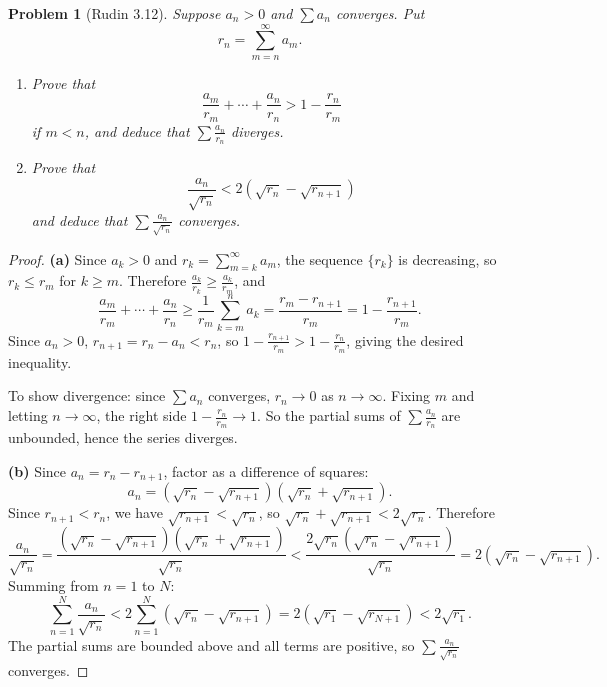 \documentclass[12 pt]{article}        	%
\newtheorem{prob}{Problem}
\begin{document}
\begin{prob}[Rudin 3.12]
Suppose $a_n > 0$ and $\sum a_n$ converges. Put
\[
r_n = \sum_{m=n}^{\infty} a_m.
\]
\begin{enumerate}
    \item[(a)] Prove that
    \[
    \frac{a_m}{r_m} + \cdots + \frac{a_n}{r_n} > 1 - \frac{r_n}{r_m}
    \]
    if $m < n$, and deduce that $\displaystyle\sum \frac{a_n}{r_n}$ diverges.
    \item[(b)] Prove that
    \[
    \frac{a_n}{\sqrt{r_n}} < 2\left(\sqrt{r_n} - \sqrt{r_{n+1}}\right)
    \]
    and deduce that $\displaystyle\sum \frac{a_n}{\sqrt{r_n}}$ converges.
\end{enumerate}
\end{prob}
\begin{proof}
\textbf{(a)} Since $a_k > 0$ and $r_k = \sum_{m=k}^{\infty} a_m$, the sequence $\{r_k\}$ is decreasing, so $r_k \leq r_m$ for $k \geq m$. Therefore $\frac{a_k}{r_k} \geq \frac{a_k}{r_m}$, and
\[
\frac{a_m}{r_m} + \cdots + \frac{a_n}{r_n} \geq \frac{1}{r_m} \sum_{k=m}^{n} a_k = \frac{r_m - r_{n+1}}{r_m} = 1 - \frac{r_{n+1}}{r_m}.
\]
Since $a_n > 0$, $r_{n+1} = r_n - a_n < r_n$, so $1 - \frac{r_{n+1}}{r_m} > 1 - \frac{r_n}{r_m}$, giving the desired inequality.

To show divergence: since $\sum a_n$ converges, $r_n \to 0$ as $n \to \infty$. Fixing $m$ and letting $n \to \infty$, the right side $1 - \frac{r_n}{r_m} \to 1$. So the partial sums of $\sum \frac{a_n}{r_n}$ are unbounded, hence the series diverges.

\textbf{(b)} Since $a_n = r_n - r_{n+1}$, factor as a difference of squares:
\[
a_n = (\sqrt{r_n} - \sqrt{r_{n+1}})(\sqrt{r_n} + \sqrt{r_{n+1}}).
\]
Since $r_{n+1} < r_n$, we have $\sqrt{r_{n+1}} < \sqrt{r_n}$, so $\sqrt{r_n} + \sqrt{r_{n+1}} < 2\sqrt{r_n}$. Therefore
\[
\frac{a_n}{\sqrt{r_n}} = \frac{(\sqrt{r_n} - \sqrt{r_{n+1}})(\sqrt{r_n} + \sqrt{r_{n+1}})}{\sqrt{r_n}} < \frac{2\sqrt{r_n}(\sqrt{r_n} - \sqrt{r_{n+1}})}{\sqrt{r_n}} = 2(\sqrt{r_n} - \sqrt{r_{n+1}}).
\]
Summing from $n = 1$ to $N$:
\[
\sum_{n=1}^{N} \frac{a_n}{\sqrt{r_n}} < 2\sum_{n=1}^{N} (\sqrt{r_n} - \sqrt{r_{n+1}}) = 2(\sqrt{r_1} - \sqrt{r_{N+1}}) < 2\sqrt{r_1}.
\]
The partial sums are bounded above and all terms are positive, so $\sum \frac{a_n}{\sqrt{r_n}}$ converges.
\end{proof}
\end{document}
